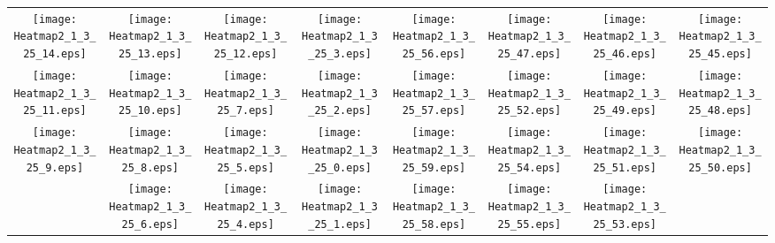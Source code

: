 \documentclass{standalone}
\begin{document}
\begin{tabular}{ *8{c} }
\texttt{[image: Heatmap2\_1\_3\_25\_14.eps]} & \texttt{[image: Heatmap2\_1\_3\_25\_13.eps]} & \texttt{[image: Heatmap2\_1\_3\_25\_12.eps]} & \texttt{[image: Heatmap2\_1\_3\_25\_3.eps]} & \texttt{[image: Heatmap2\_1\_3\_25\_56.eps]} & \texttt{[image: Heatmap2\_1\_3\_25\_47.eps]} & \texttt{[image: Heatmap2\_1\_3\_25\_46.eps]} & \texttt{[image: Heatmap2\_1\_3\_25\_45.eps]} \\
\texttt{[image: Heatmap2\_1\_3\_25\_11.eps]} & \texttt{[image: Heatmap2\_1\_3\_25\_10.eps]} & \texttt{[image: Heatmap2\_1\_3\_25\_7.eps]} & \texttt{[image: Heatmap2\_1\_3\_25\_2.eps]} & \texttt{[image: Heatmap2\_1\_3\_25\_57.eps]} & \texttt{[image: Heatmap2\_1\_3\_25\_52.eps]} & \texttt{[image: Heatmap2\_1\_3\_25\_49.eps]} & \texttt{[image: Heatmap2\_1\_3\_25\_48.eps]} \\
\texttt{[image: Heatmap2\_1\_3\_25\_9.eps]} & \texttt{[image: Heatmap2\_1\_3\_25\_8.eps]} & \texttt{[image: Heatmap2\_1\_3\_25\_5.eps]} & \texttt{[image: Heatmap2\_1\_3\_25\_0.eps]} & \texttt{[image: Heatmap2\_1\_3\_25\_59.eps]} & \texttt{[image: Heatmap2\_1\_3\_25\_54.eps]} & \texttt{[image: Heatmap2\_1\_3\_25\_51.eps]} & \texttt{[image: Heatmap2\_1\_3\_25\_50.eps]} \\
 & \texttt{[image: Heatmap2\_1\_3\_25\_6.eps]} & \texttt{[image: Heatmap2\_1\_3\_25\_4.eps]} & \texttt{[image: Heatmap2\_1\_3\_25\_1.eps]} & \texttt{[image: Heatmap2\_1\_3\_25\_58.eps]} & \texttt{[image: Heatmap2\_1\_3\_25\_55.eps]} & \texttt{[image: Heatmap2\_1\_3\_25\_53.eps]} &  
\end{tabular}
\end{document}
